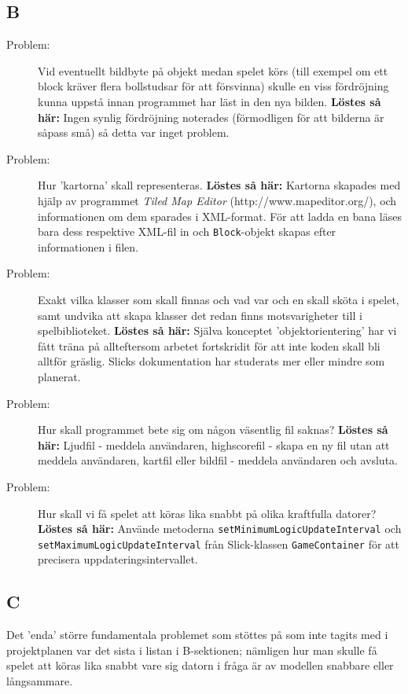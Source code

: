 \documentclass[11pt,a4paper]{article}
\begin{document}
\subsection{B}
\begin{description}
	\item[Problem:] Vid eventuellt bildbyte på objekt medan spelet körs (till exempel om ett block kräver flera bollstudsar för att försvinna) skulle en viss fördröjning kunna uppstå innan programmet har läst in den nya bilden. \textbf{Löstes så här:} Ingen synlig fördröjning noterades (förmodligen för att bilderna är såpass små) så detta var inget problem.
	\item[Problem:] Hur 'kartorna' skall representeras. \textbf{Löstes så här:} Kartorna skapades med hjälp av programmet \emph{Tiled Map Editor} (http://www.mapeditor.org/), och informationen om dem sparades i XML-format. För att ladda en bana läses bara dess respektive XML-fil in och \texttt{Block}-objekt skapas efter informationen i filen.
	\item[Problem:] Exakt vilka klasser som skall finnas och vad var och en skall sköta i spelet, samt undvika att skapa klasser det redan finns motsvarigheter till i spelbiblioteket. \textbf{Löstes så här:} Själva konceptet 'objektorientering' har vi fått träna på allteftersom arbetet fortskridit för att inte koden skall bli alltför gräslig. Slicks dokumentation har studerats mer eller mindre som planerat.
	\item[Problem:] Hur skall programmet bete sig om någon väsentlig fil saknas? \textbf{Löstes så här:} Ljudfil - meddela användaren, highscorefil - skapa en ny fil utan att meddela användaren, kartfil eller bildfil - meddela användaren och avsluta.
	\item[Problem:] Hur skall vi få spelet att köras lika snabbt på olika kraftfulla datorer? \textbf{Löstes så här:} Använde metoderna \texttt{setMinimumLogicUpdateInterval} och \texttt{setMaximumLogicUpdateInterval} från Slick-klassen \texttt{GameContainer} för att precisera uppdateringsintervallet.
\end{description}

\subsection{C}
Det 'enda' större fundamentala problemet som stöttes på som inte tagits med i projektplanen var det sista i listan i B-sektionen; nämligen hur man skulle få spelet att köras lika snabbt vare sig datorn i fråga är av modellen snabbare eller långsammare.
\end{document}
